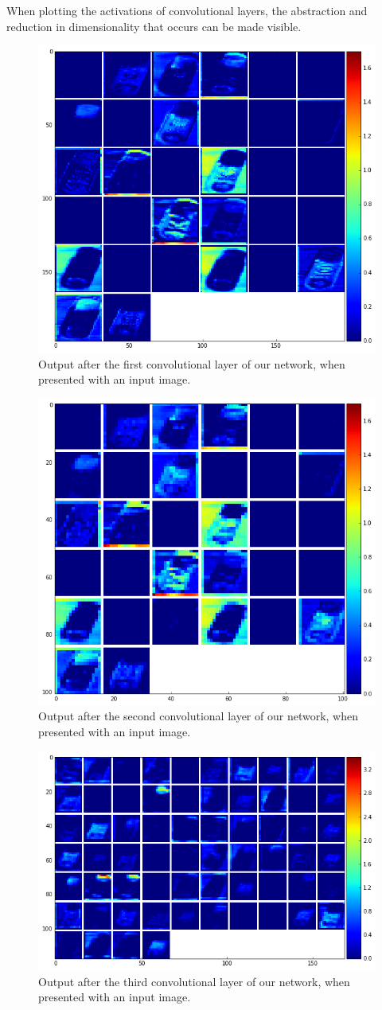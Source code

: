 \documentclass[	DIV=calc,%
				paper=a4,%
				fontsize=11pt,%
				twocolumn]{scrartcl}	 %
\begin{document}
When plotting the activations of convolutional layers, the abstraction and reduction in dimensionality that occurs can be made visible.

\begin{figure}[H]
    \centering
    \includegraphics[width=0.5\linewidth]{data/final_cnn_firstlayer}
    \caption{Output after the first convolutional layer of our network, when presented with an input image.}
\end{figure}

\begin{figure}[H]
    \centering
    \includegraphics[width=0.5\linewidth]{data/final_cnn_secondlayer}
    \caption{Output after the second convolutional layer of our network, when presented with an input image.}
\end{figure}

\begin{figure}[H]
    \centering
    \includegraphics[width=0.5\linewidth]{data/final_cnn_thirdlayer}
    \caption{Output after the third convolutional layer of our network, when presented with an input image.}
\end{figure}
\end{document}
